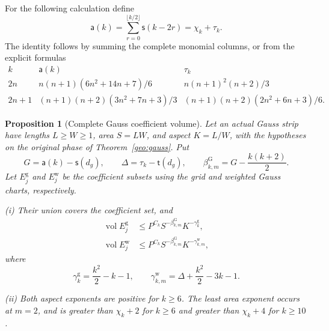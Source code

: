 \documentclass[11pt]{amsart}
\newtheorem{proposition}[theorem]{Proposition}
\theoremstyle{definition}
\theoremstyle{remark}
\numberwithin{equation}{section}
\begin{document}
For the following calculation define
\[
 \mathsf{a}(k)=\sum_{r=0}^{\lfloor k/2\rfloor}\mathsf{s}(k-2r)=\chi_k+\tau_k.
\]
The identity follows by summing the complete monomial columns, or from the explicit formulas
\[
\begin{array}{c|cc}
k&\mathsf{a}(k)&\tau_k\\\hline
2n&n(n+1)(6n^2+14n+7)/6&n(n+1)^2(n+2)/3\\
2n+1&(n+1)(n+2)(3n^2+7n+3)/3&(n+1)(n+2)(2n^2+6n+3)/6.
\end{array}
\]

\begin{proposition}[Complete Gauss coefficient volume]\label{surf:gauss-tail}
Let an actual Gauss strip have lengths $L\ge W\ge1$, area $S=LW$, and aspect $K=L/W$, with the hypotheses on the original phase of Theorem~\ref{geo:gauss}. Put
\[
G=\mathsf{a}(k)-\mathsf{s}(d_g),\qquad \Delta=\tau_k-\mathsf{t}(d_g),\qquad \beta^{\mathrm G}_{k,m}=G-\frac{k(k+2)}2.
\]
Let $E_j^{\mathrm g}$ and $E_j^{\mathrm w}$ be the coefficient subsets using the grid and weighted Gauss charts, respectively.

\noindent\textup{(i)} Their union covers the coefficient set, and
\[
\begin{aligned}
\operatorname{vol}E_j^{\mathrm g}&\le P^{C_k}S^{-\beta^{\mathrm G}_{k,m}}K^{-\gamma_k^{\mathrm g}},\\
\operatorname{vol}E_j^{\mathrm w}&\le P^{C_k}S^{-\beta^{\mathrm G}_{k,m}}K^{-\gamma_{k,m}^{\mathrm w}},
\end{aligned}
\]
where
\[
 \gamma_k^{\mathrm g}=\frac{k^2}2-k-1,\qquad \gamma_{k,m}^{\mathrm w}=\Delta+\frac{k^2}2-3k-1.
\]

\noindent\textup{(ii)} Both aspect exponents are positive for $k\ge6$. The least area exponent occurs at $m=2$, and is greater than $\chi_k+2$ for $k\ge6$ and greater than $\chi_k+4$ for $k\ge10$.
\end{proposition}
\end{document}
